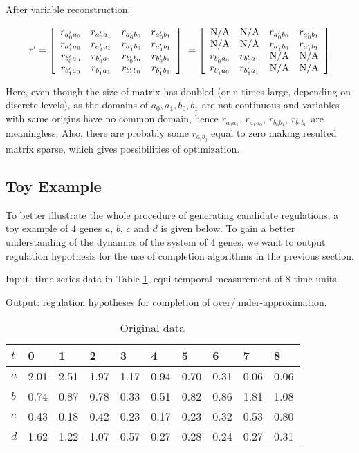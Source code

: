 After variable reconstruction:

$$r'=\left[
\begin{array}{*{20}c}
r_{a'_0a_0} & r_{a'_0a_1}& r_{a'_0b_0}&r_{a'_0b_1}\\
r_{a'_1a_0} & r_{a'_1a_1}& r_{a'_1b_0}&r_{a'_1b_1}\\
r_{b'_0a_0} & r_{b'_0a_1}& r_{b'_0b_0}&r_{b'_0b_1}\\
r_{b'_1a_0} & r_{b'_1a_1}& r_{b'_1b_0}&r_{b'_1b_1}\\
\end{array}
\right]\ =\left[\begin{array}{*{20}c}
{\rm N/A} & {\rm N/A}& r_{a'_0b_0}&r_{a'_0b_1}\\
{\rm N/A} & {\rm N/A}& r_{a'_1b_0}&r_{a'_1b_1}\\
r_{b'_0a_0} & r_{b'_0a_1}& {\rm N/A}&{\rm N/A}\\
r_{b'_1a_0} & r_{b'_1a_1}& {\rm N/A}&{\rm N/A}\\
\end{array}\right]$$

Here, even though the size of matrix has doubled (or n times large, depending on discrete levels), as the domains of $a_0,a_1,b_0,b_1$ are not continuous and variables with same origins have no common domain, hence $r_{a_0a_1}$, $r_{a_1a_0}$, $r_{b_0b_1}$, $r_{b_1b_0}$ are meaningless. Also, there are probably some $r_{a_ib_j}$ equal to zero making resulted matrix sparse, which gives possibilities of optimization.
\subsection{Toy Example}
To better illustrate the whole procedure of generating candidate regulations, a toy example of $4$ genes $a$, $b$, $c$ and $d$ is given below.
To gain a better understanding of the dynamics of the system of 4 genes, we want to output regulation hypothesis for the use of completion algorithms in the previous section.

Input: time series data in Table \ref{TyTable1}, equi-temporal measurement of 8 time units.

Output: regulation hypotheses for completion of over/under-approximation.

\begin{table}[!ht]
\centering
\begin{tabular}{*{10}{l}}
$t$&0&1&2&3&4&5&6&7&8\\
\hline
$a$&2.01&2.51&1.97&1.17&0.94&0.70&0.31&0.06&0.06\\
$b$&0.74&0.87&0.78&0.33&0.51&0.82&0.86&1.81&1.08\\
$c$&0.43&0.18&0.42&0.23&0.17&0.23&0.32&0.53&0.80\\
$d$&1.62&1.22&1.07&0.57&0.27&0.28&0.24&0.27&0.31
\end{tabular} 
\caption{Original data}\label{TyTable1}
\end{table}



